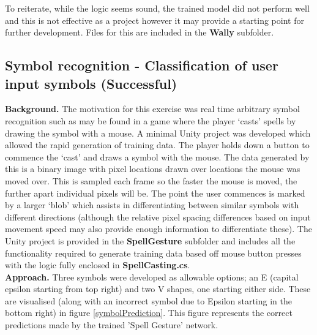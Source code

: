 \documentclass{article}
\begin{document}

To reiterate, while the logic seems sound, the trained model did not perform well and this is not effective as a project however it may provide a starting point for further development. Files for this are included in the \textbf{Wally} subfolder.

\subsection{Symbol recognition - Classification of user input symbols (Successful)}

\textbf{Background.} The motivation for this exercise was real time arbitrary symbol recognition such as may be found in a game where the player `casts' spells by drawing the symbol with a mouse. A minimal Unity project was developed which allowed the rapid generation of training data. The player holds down a button to commence the `cast' and draws a symbol with the mouse. The data generated by this is a binary image with pixel locations drawn over locations the mouse was moved over. This is sampled each frame so the faster the mouse is moved, the further apart individual pixels will be. The point the user commences is marked by a larger `blob' which assists in differentiating between similar symbols with different directions (although the relative pixel spacing differences based on input movement speed may also provide enough information to differentiate these). The Unity project is provided in the \textbf{SpellGesture} subfolder and includes all the functionality required to generate training data based off mouse button presses with the logic fully enclosed in \textbf{SpellCasting.cs}. \\

\textbf{Approach.} Three symbols were developed as allowable options; an E (capital epsilon starting from top right) and two V shapes, one starting either side. These are visualised (along with an incorrect symbol due to Epsilon starting in the bottom right) in figure \ref{symbolPrediction}. This figure represents the correct predictions made by the trained 'Spell Gesture' network.
\end{document}
